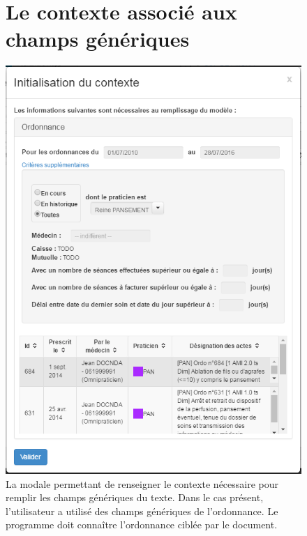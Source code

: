 \begin{appendices}
\begin{figure}[H]
	\section*{Le contexte associé aux champs génériques}
	\centering
	\includegraphics[width=14cm]{./img/context}
	\caption{\label{fig:editeur_context} La modale permettant de renseigner le contexte nécessaire pour remplir les champs génériques du texte. Dans le cas présent, l'utilisateur a utilisé des champs génériques de l'ordonnance. Le programme doit connaître l'ordonnance ciblée par le document.}
\end{figure}

\newpage
\begin{figure}[H]

\end{figure}
\end{appendices}
